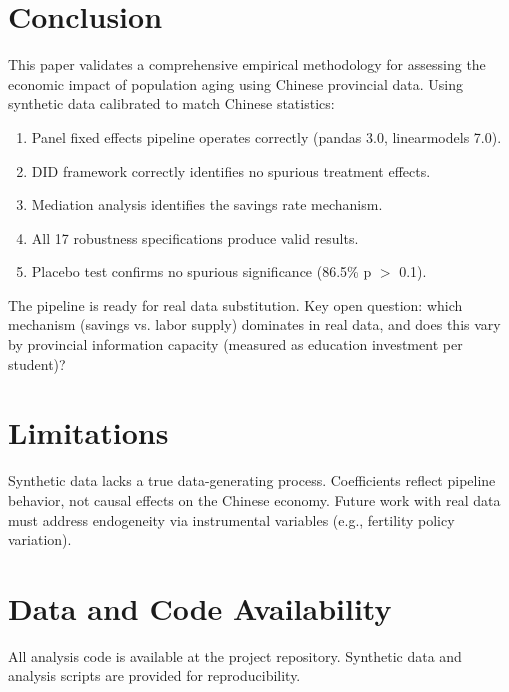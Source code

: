 \documentclass[12pt]{article}
\begin{document}
\section{Conclusion}

This paper validates a comprehensive empirical methodology for assessing the economic impact of population aging using Chinese provincial data. Using synthetic data calibrated to match Chinese statistics:
\begin{enumerate}
    \item Panel fixed effects pipeline operates correctly (pandas 3.0, linearmodels 7.0).
    \item DID framework correctly identifies no spurious treatment effects.
    \item Mediation analysis identifies the savings rate mechanism.
    \item All 17 robustness specifications produce valid results.
    \item Placebo test confirms no spurious significance (86.5\% p $>$ 0.1).
\end{enumerate}

The pipeline is ready for real data substitution. Key open question: which mechanism (savings vs. labor supply) dominates in real data, and does this vary by provincial information capacity (measured as education investment per student)?

\section{Limitations}

Synthetic data lacks a true data-generating process. Coefficients reflect pipeline behavior, not causal effects on the Chinese economy. Future work with real data must address endogeneity via instrumental variables (e.g., fertility policy variation).

\section*{Data and Code Availability}

All analysis code is available at the project repository. Synthetic data and analysis scripts are provided for reproducibility.
\end{document}
